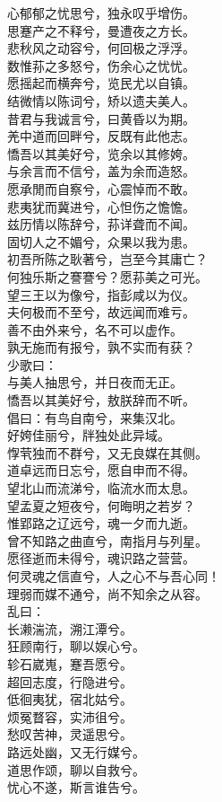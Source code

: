 \documentclass[]{article}
\begin{document}
心郁郁之忧思兮，独永叹乎增伤。\\
思蹇产之不释兮，曼遭夜之方长。\\
悲秋风之动容兮，何回极之浮浮。\\
数惟荪之多怒兮，伤余心之忧忧。\\
愿摇起而横奔兮，览民尤以自镇。\\
结微情以陈词兮，矫以遗夫美人。\\
昔君与我诚言兮，曰黄昏以为期。\\
羌中道而回畔兮，反既有此他志。\\
憍吾以其美好兮，览余以其修姱。\\
与余言而不信兮，盖为余而造怒。\\
愿承閒而自察兮，心震悼而不敢。\\
悲夷犹而冀进兮，心怛伤之憺憺。\\
兹历情以陈辞兮，荪详聋而不闻。\\
固切人之不媚兮，众果以我为患。\\
初吾所陈之耿著兮，岂至今其庸亡？\\
何独乐斯之謇謇兮？愿荪美之可光。\\
望三王以为像兮，指彭咸以为仪。\\
夫何极而不至兮，故远闻而难亏。\\
善不由外来兮，名不可以虚作。\\
孰无施而有报兮，孰不实而有获？\\
少歌曰：\\
与美人抽思兮，并日夜而无正。\\
憍吾以其美好兮，敖朕辞而不听。\\
倡曰：有鸟自南兮，来集汉北。\\
好姱佳丽兮，牉独处此异域。\\
惸茕独而不群兮，又无良媒在其侧。\\
道卓远而日忘兮，愿自申而不得。\\
望北山而流涕兮，临流水而太息。\\
望孟夏之短夜兮，何晦明之若岁？\\
惟郢路之辽远兮，魂一夕而九逝。\\
曾不知路之曲直兮，南指月与列星。\\
愿径逝而未得兮，魂识路之营营。\\
何灵魂之信直兮，人之心不与吾心同！\\
理弱而媒不通兮，尚不知余之从容。\\
乱曰：\\
长濑湍流，溯江潭兮。\\
狂顾南行，聊以娱心兮。\\
轸石崴嵬，蹇吾愿兮。\\
超回志度，行隐进兮。\\
低徊夷犹，宿北姑兮。\\
烦冤瞀容，实沛徂兮。\\
愁叹苦神，灵遥思兮。\\
路远处幽，又无行媒兮。\\
道思作颂，聊以自救兮。\\
忧心不遂，斯言谁告兮。
\end{document}
